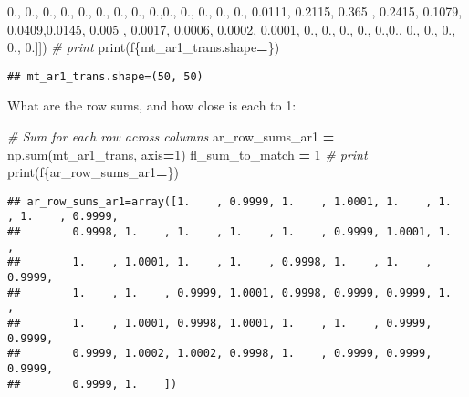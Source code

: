 \documentclass[
]{book}
\newenvironment{Shaded}{\begin{snugshade}}{\end{snugshade}}
\newcommand{\BuiltInTok}[1]{#1}
\newcommand{\CommentTok}[1]{\textcolor[rgb]{0.56,0.35,0.01}{\textit{#1}}}
\newcommand{\DecValTok}[1]{\textcolor[rgb]{0.00,0.00,0.81}{#1}}
\newcommand{\FloatTok}[1]{\textcolor[rgb]{0.00,0.00,0.81}{#1}}
\newcommand{\NormalTok}[1]{#1}
\newcommand{\OperatorTok}[1]{\textcolor[rgb]{0.81,0.36,0.00}{\textbf{#1}}}
\newcommand{\SpecialCharTok}[1]{\textcolor[rgb]{0.00,0.00,0.00}{#1}}
\newcommand{\SpecialStringTok}[1]{\textcolor[rgb]{0.31,0.60,0.02}{#1}}
\begin{document}
\begin{Shaded}
\begin{Highlighting}[]
\FloatTok{0.}\NormalTok{, }\FloatTok{0.}\NormalTok{, }\FloatTok{0.}\NormalTok{, }\FloatTok{0.}\NormalTok{, }\FloatTok{0.}\NormalTok{, }\FloatTok{0.}\NormalTok{, }\FloatTok{0.}\NormalTok{, }\FloatTok{0.}\NormalTok{, }\FloatTok{0.}\NormalTok{,}\FloatTok{0.}\NormalTok{, }\FloatTok{0.}\NormalTok{, }\FloatTok{0.}\NormalTok{, }\FloatTok{0.}\NormalTok{, }\FloatTok{0.}\NormalTok{, }\FloatTok{0.0111}\NormalTok{, }\FloatTok{0.2115}\NormalTok{, }\FloatTok{0.365}\NormalTok{ ,}
\FloatTok{0.2415}\NormalTok{, }\FloatTok{0.1079}\NormalTok{, }\FloatTok{0.0409}\NormalTok{,}\FloatTok{0.0145}\NormalTok{, }\FloatTok{0.005}\NormalTok{ , }\FloatTok{0.0017}\NormalTok{, }\FloatTok{0.0006}\NormalTok{, }\FloatTok{0.0002}\NormalTok{, }\FloatTok{0.0001}\NormalTok{, }\FloatTok{0.}\NormalTok{, }\FloatTok{0.}\NormalTok{,}
\FloatTok{0.}\NormalTok{, }\FloatTok{0.}\NormalTok{, }\FloatTok{0.}\NormalTok{,}\FloatTok{0.}\NormalTok{, }\FloatTok{0.}\NormalTok{, }\FloatTok{0.}\NormalTok{, }\FloatTok{0.}\NormalTok{, }\FloatTok{0.}\NormalTok{, }\FloatTok{0.}\NormalTok{]])}
\CommentTok{\# print}
\BuiltInTok{print}\NormalTok{(}\SpecialStringTok{f\textquotesingle{}}\SpecialCharTok{\{}\NormalTok{mt\_ar1\_trans}\SpecialCharTok{.}\NormalTok{shape}\OperatorTok{=}\SpecialCharTok{\}}\SpecialStringTok{\textquotesingle{}}\NormalTok{)}
\end{Highlighting}
\end{Shaded}

\begin{verbatim}
## mt_ar1_trans.shape=(50, 50)
\end{verbatim}

What are the row sums, and how close is each to 1:

\begin{Shaded}
\begin{Highlighting}[]
\CommentTok{\# Sum for each row across columns}
\NormalTok{ar\_row\_sums\_ar1 }\OperatorTok{=}\NormalTok{ np.}\BuiltInTok{sum}\NormalTok{(mt\_ar1\_trans, axis}\OperatorTok{=}\DecValTok{1}\NormalTok{)}
\NormalTok{fl\_sum\_to\_match }\OperatorTok{=} \DecValTok{1}
\CommentTok{\# print}
\BuiltInTok{print}\NormalTok{(}\SpecialStringTok{f\textquotesingle{}}\SpecialCharTok{\{}\NormalTok{ar\_row\_sums\_ar1}\OperatorTok{=}\SpecialCharTok{\}}\SpecialStringTok{\textquotesingle{}}\NormalTok{)}
\end{Highlighting}
\end{Shaded}

\begin{verbatim}
## ar_row_sums_ar1=array([1.    , 0.9999, 1.    , 1.0001, 1.    , 1.    , 1.    , 0.9999,
##        0.9998, 1.    , 1.    , 1.    , 1.    , 0.9999, 1.0001, 1.    ,
##        1.    , 1.0001, 1.    , 1.    , 0.9998, 1.    , 1.    , 0.9999,
##        1.    , 1.    , 0.9999, 1.0001, 0.9998, 0.9999, 0.9999, 1.    ,
##        1.    , 1.0001, 0.9998, 1.0001, 1.    , 1.    , 0.9999, 0.9999,
##        0.9999, 1.0002, 1.0002, 0.9998, 1.    , 0.9999, 0.9999, 0.9999,
##        0.9999, 1.    ])
\end{verbatim}
\end{document}
